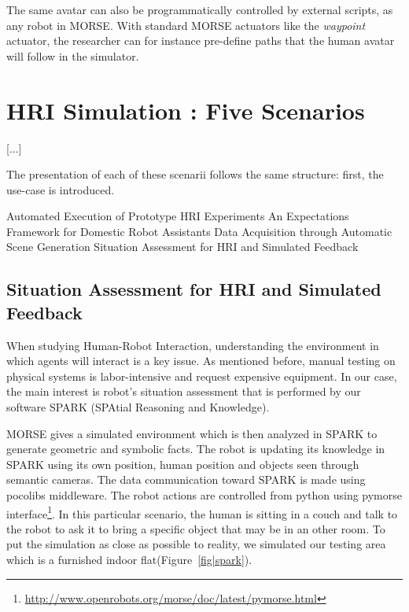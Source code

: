 \documentclass[conference]{IEEEtran}
\begin{document}
The same avatar can also be programmatically controlled by external scripts, as
any robot in MORSE. With standard MORSE actuators like the \emph{waypoint} actuator,
the researcher can for instance pre-define paths that the human avatar will
follow in the simulator.



\section{HRI Simulation : Five Scenarios}

[...]

The presentation of each of these scenarii follows the same structure: first,
the use-case is introduced.


Automated Execution of Prototype HRI Experiments
An Expectations Framework for Domestic Robot Assistants
Data Acquisition through Automatic Scene Generation
Situation Assessment for HRI and Simulated Feedback

\subsection{Situation Assessment for HRI and Simulated Feedback}
\label{sc:assessment}

When studying Human-Robot Interaction, understanding the environment in which
agents will interact is a key issue. As mentioned before, manual testing on
physical systems is labor-intensive and request expensive equipment.
In our case, the main interest is robot's situation assessment that is performed 
by our software SPARK (SPAtial Reasoning and Knowledge). 

MORSE gives a simulated environment which is then analyzed in SPARK
to generate geometric and symbolic facts. The robot is updating its knowledge
in SPARK using its own position, human position and objects seen through
semantic cameras. The data communication toward SPARK is made using pocolibs
middleware. The robot actions are controlled from python using pymorse
interface\footnote{\url{http://www.openrobots.org/morse/doc/latest/pymorse.html}}.
In this particular scenario, the human is sitting in a couch and talk to the
robot to ask it to bring a specific object that may be in an other room.
To put the simulation as close as possible to reality, we simulated our testing
area which is a furnished indoor flat(Figure~\ref{fig|spark}).
\end{document}
